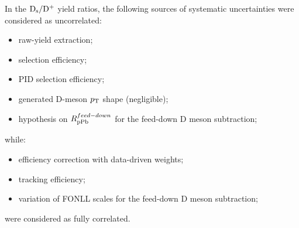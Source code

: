 In the ${\rm D_s}/{\rm D^+}$ yield ratios, the following sources of systematic 
uncertainties were considered as uncorrelated:
\begin{itemize}
\item raw-yield extraction;
\item selection efficiency;
\item PID selection efficiency;
\item generated D-meson $p_{\rm T}$ shape (negligible);
\item hypothesis on $R_{\rm pPb}^{feed-down}$ for the feed-down D meson subtraction;
\end{itemize}
while:
\begin{itemize}
\item efficiency correction with data-driven weights;
\item tracking efficiency;
\item variation of FONLL scales for the feed-down D meson subtraction;
\end{itemize} 
were considered as fully correlated.


